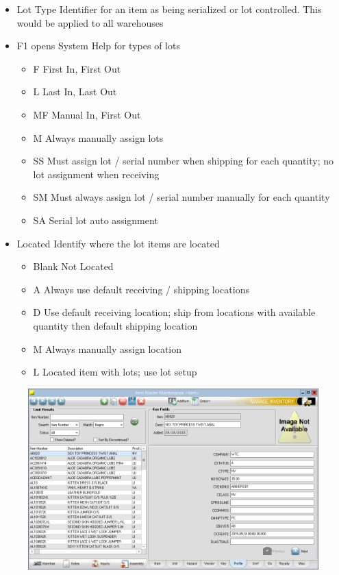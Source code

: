 \begin{enumerate}
\begin{itemize}
\begin{itemize}
			\item Lot Type \textemdash Identifier for an item as being serialized or lot controlled. This would be applied to all warehouses
			\item F1 opens System Help for types of lots
			\begin{itemize}
				\item F \textemdash First In, First Out
				\item L \textemdash Last In, Last Out
				\item MF \textemdash Manual In, First Out
				\item M \textemdash Always manually assign lots
				\item SS \textemdash Must assign lot / serial number when shipping for each quantity; no lot assignment when receiving
				\item SM \textemdash Must always assign lot / serial number manually for each quantity
				\item SA \textemdash Serial lot auto assignment
			\end{itemize}
			\item Located \textemdash Identify where the lot items are located
			\begin{itemize}
				\item Blank \textemdash Not Located
				\item A \textemdash Always use default receiving / shipping locations
				\item D \textemdash Use default receiving location; ship from locations with available quantity then default shipping location
				\item M \textemdash Always manually assign location
				\item L \textemdash Located item with lots; use lot setup
			\end{itemize}
		\end{itemize}
	\end{itemize}
	\begin{figure}[H]
		\includegraphics[width=\textwidth]{../img/image60}

\end{figure}
\end{enumerate}
